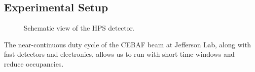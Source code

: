 \documentclass[b1]{sciposter}
\begin{document}
\begin{multicols}{3}
	\section*{Experimental Setup}
	\begin{figure}
		\begin{center}
			\caption{Schematic view of the HPS detector.}
		\end{center}
	\end{figure}

	The near-continuous duty cycle of the CEBAF beam at Jefferson Lab, along with fast detectors and electronics, allows us to run with short time windows and reduce occupancies.







\end{multicols}
\end{document}
